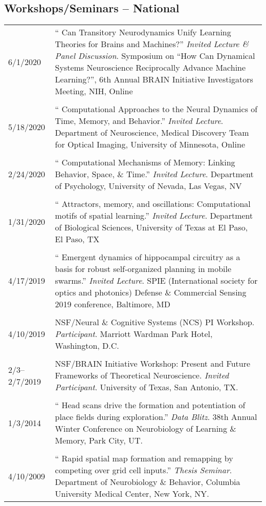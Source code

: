 \documentclass[10pt]{article}
\newcommand{\unpubtitle}[1]{{\color{hopkinsblue} #1}}
\begin{document}
\subsection*{Workshops/Seminars -- National}

\begin{longtable}{@{\hspace{0.2in}}l>{\raggedright\arraybackslash}p{}}
  6/1/2020 \hspace{0.3in} & ``\unpubtitle{Can Transitory Neurodynamics Unify
  Learning Theories for Brains and Machines?}'' \emph{Invited Lecture \&
  Panel Discussion}. Symposium on ``How Can Dynamical Systems Neuroscience
  Reciprocally Advance Machine Learning?'', 6th Annual BRAIN Initiative
  Investigators Meeting, NIH, Online\\
  \tabularnewline
  5/18/2020 \hspace{0.3in} & ``\unpubtitle{Computational Approaches to the
  Neural Dynamics of Time, Memory, and Behavior}.'' \emph{Invited Lecture}.
  Department of Neuroscience, Medical Discovery Team for Optical Imaging,
  University of Minnesota, Online\\
  \tabularnewline
  2/24/2020 \hspace{0.3in} & ``\unpubtitle{Computational Mechanisms of Memory:
  Linking Behavior, Space, \& Time}.'' \emph{Invited Lecture}. Department of
  Psychology, University of Nevada, Las Vegas, NV\\
  \tabularnewline
  1/31/2020 \hspace{0.3in} & ``\unpubtitle{Attractors, memory, and oscillations:
  Computational motifs of spatial learning}.'' \emph{Invited Lecture}.
  Department of Biological Sciences, University of Texas at El Paso, El Paso, TX\\
  \tabularnewline
  4/17/2019 \hspace{0.3in} & ``\unpubtitle{Emergent dynamics of hippocampal
  circuitry as a basis for robust self-organized planning in mobile swarms}.''
  \emph{Invited Lecture}. SPIE (International society for optics and photonics)
  Defense \& Commercial Sensing 2019 conference, Baltimore, MD\\
  \tabularnewline
  4/10/2019 & NSF/Neural \& Cognitive Systems (NCS) PI
  Workshop. \emph{Participant}. Marriott Wardman Park Hotel, Washington, D.C.\\
  \tabularnewline
  2/3--2/7/2019 & NSF/BRAIN Initiative Workshop: Present and Future Frameworks
  of Theoretical Neuroscience. \emph{Invited Participant}. University of Texas,
  San Antonio, TX.\\
  \tabularnewline
  1/3/2014 & ``\unpubtitle{Head scans drive the formation and potentiation
  of place fields during exploration}.'' \emph{Data Blitz}. 38th Annual Winter
  Conference on Neurobiology of Learning \& Memory, Park City, UT.\\
  \tabularnewline
  4/10/2009 & ``\unpubtitle{Rapid spatial map formation and remapping by
  competing over grid cell inputs}.'' \emph{Thesis Seminar}. Department of
  Neurobiology \& Behavior, Columbia University Medical Center, New York, NY.\\
\end{longtable}
\end{document}
